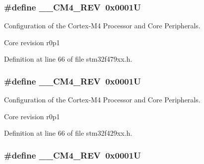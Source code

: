 \subsubsection[{\texorpdfstring{\+\_\+\+\_\+\+C\+M4\+\_\+\+R\+EV}{__CM4_REV}}]{\setlength{\rightskip}{0pt plus 5cm}\#define \+\_\+\+\_\+\+C\+M4\+\_\+\+R\+EV~0x0001U}\hypertarget{group___configuration__section__for___c_m_s_i_s_ga45a97e4bb8b6ce7c334acc5f45ace3ba}{}\label{group___configuration__section__for___c_m_s_i_s_ga45a97e4bb8b6ce7c334acc5f45ace3ba}


Configuration of the Cortex-\/\+M4 Processor and Core Peripherals. 

Core revision r0p1 

Definition at line 66 of file stm32f479xx.\+h.

\subsubsection[{\texorpdfstring{\+\_\+\+\_\+\+C\+M4\+\_\+\+R\+EV}{__CM4_REV}}]{\setlength{\rightskip}{0pt plus 5cm}\#define \+\_\+\+\_\+\+C\+M4\+\_\+\+R\+EV~0x0001U}\hypertarget{group___configuration__section__for___c_m_s_i_s_ga45a97e4bb8b6ce7c334acc5f45ace3ba}{}\label{group___configuration__section__for___c_m_s_i_s_ga45a97e4bb8b6ce7c334acc5f45ace3ba}


Configuration of the Cortex-\/\+M4 Processor and Core Peripherals. 

Core revision r0p1 

Definition at line 66 of file stm32f429xx.\+h.

\subsubsection[{\texorpdfstring{\+\_\+\+\_\+\+C\+M4\+\_\+\+R\+EV}{__CM4_REV}}]{\setlength{\rightskip}{0pt plus 5cm}\#define \+\_\+\+\_\+\+C\+M4\+\_\+\+R\+EV~0x0001U}\hypertarget{group___configuration__section__for___c_m_s_i_s_ga45a97e4bb8b6ce7c334acc5f45ace3ba}{}\label{group___configuration__section__for___c_m_s_i_s_ga45a97e4bb8b6ce7c334acc5f45ace3ba}


